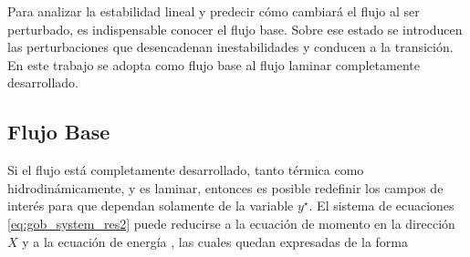Para analizar la estabilidad lineal y predecir cómo cambiará el flujo al ser perturbado, es indispensable conocer el flujo base. Sobre ese estado se introducen las perturbaciones que desencadenan inestabilidades y conducen a la transición. En este trabajo se adopta como flujo base al flujo laminar completamente desarrollado. 


\subsection{Flujo Base} \label{sec:fbase}

Si el flujo está completamente desarrollado, tanto térmica como hidrodinámicamente, y es laminar, entonces es posible redefinir los campos de interés para que dependan solamente de la variable $y^{\star}$. El sistema de ecuaciones \ref{eq:gob_system_res2} puede reducirse a la ecuación de momento en la dirección $X$ y a la ecuación de energía \cite{chen1996linear}, las cuales quedan expresadas de la forma 


